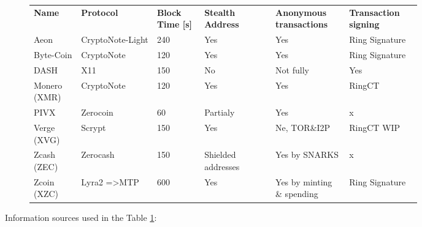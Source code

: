 \documentclass[
  printed, %
  table,   %
  nolof,     %
  nolot,     %
           oneside, color
]{fithesis3}
\begin{document}
\begin{figure}[H]
\centering
\begin{tabular}{p{0.1\linewidth}p{0.16\linewidth}p{0.1\linewidth}p{0.15\linewidth}p{0.15\linewidth}p{0.15\linewidth}}
\textbf{Name}        & \textbf{Protocol}                & \textbf{Block Time {[}s{]}} & \textbf{Stealth Address    }      & \textbf{Anonymous transactions} & \textbf{Transaction signing}  \\
Aeon         & CryptoNote-Light        & 240                & Yes                      & Yes                & Ring Signature \\
Byte-Coin     & CryptoNote              & 120                & Yes                      & Yes                & Ring Signature \\
DASH         & X11                     & 150                & No                       & Not fully           & Yes            \\
Monero (XMR) & CryptoNote              & 120                & Yes                      & Yes                & RingCT         \\
PIVX         & Zerocoin                & 60                 & Partialy & Yes                & x              \\
Verge (XVG)  & Scrypt                  & 150                & Yes                      & Ne, TOR\&I2P       & RingCT WIP     \\
Zcash (ZEC)  & Zerocash                & 150                & Shielded addresses  & Yes by SNARKS    & x              \\
Zcoin (XZC)  & Lyra2 =\textgreater MTP & 600                & Yes                      & Yes by minting \& spending  & Ring Signature

\end{tabular}
\label{table:monero-alternatives}


\end{figure}
Information sources used in the Table \ref{table:monero-alternatives}:\\ %
\end{document}

